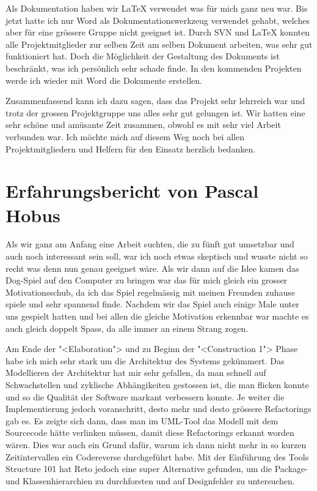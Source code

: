 \documentclass[12pt,halfparskip]{scrartcl}
\begin{document}
Als Dokumentation haben wir \LaTeX{} verwendet was für mich ganz neu war. Bis jetzt hatte ich nur Word als Dokumentationswerkzeug verwendet gehabt, welches aber für eine grössere Gruppe nicht geeignet ist. Durch SVN und \LaTeX{} konnten alle Projektmitglieder zur selben Zeit am selben Dokument arbeiten, was sehr gut funktioniert hat. Doch die Möglichkeit der Gestaltung des Dokuments ist beschränkt, was ich persönlich sehr schade finde. In den kommenden Projekten werde ich wieder mit Word die Dokumente erstellen.

Zusammenfassend kann ich dazu sagen, dass das Projekt sehr lehrreich war und trotz der grossen Projektgruppe uns alles sehr gut gelungen ist. Wir hatten eine sehr schöne und amüsante Zeit zusammen, obwohl es mit sehr viel Arbeit verbunden war. Ich möchte mich auf diesem Weg noch bei allen Projektmitgliedern und Helfern für den Einsatz herzlich bedanken.


\section{Erfahrungsbericht von Pascal Hobus}

Als wir ganz am Anfang eine Arbeit suchten, die zu fünft gut umsetzbar und auch noch interessant sein soll, war ich noch etwas skeptisch und wusste nicht so recht was denn nun genau geeignet wäre. Als wir dann auf die Idee kamen das Dog-Spiel auf den Computer zu bringen war das für mich gleich ein grosser Motivationsschub, da ich das Spiel regelmässig mit meinen Freunden zuhause spiele und sehr spannend finde. Nachdem wir das Spiel auch einige Male unter uns gespielt hatten und bei allen die gleiche Motivation erkennbar war machte es auch gleich doppelt Spass, da alle immer an einem Strang zogen.

Am Ende der "<Elaboration"> und zu Beginn der "<Construction 1"> Phase habe ich mich sehr stark um die Architektur des Systems gekümmert. Das Modellieren der Architektur hat mir sehr gefallen, da man schnell auf Schwachstellen und zyklische Abhängikeiten gestossen ist, die man flicken konnte und so die Qualität der Software markant verbessern konnte. Je weiter die Implementierung jedoch voranschritt, desto mehr und desto grössere Refactorings gab es. Es zeigte sich dann, dass man im UML-Tool das Modell mit dem Sourcecode hätte verlinken müssen, damit diese Refactorings erkannt worden wären. Dies war auch ein Grund dafür, warum ich dann nicht mehr in so kurzen Zeitintervallen ein Codereverse durchgeführt habe. Mit der Einführung des Tools Structure 101 hat Reto jedoch eine super Alternative gefunden, um die Package- und Klassenhierarchien zu durchforsten und auf Designfehler zu untersuchen.
\end{document}
